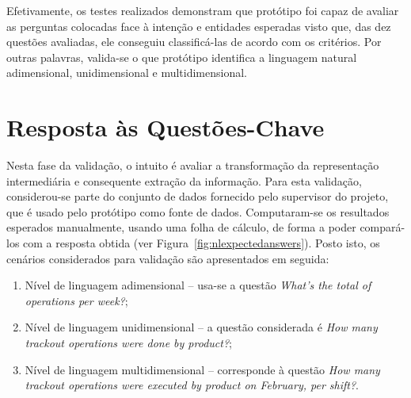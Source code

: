 Efetivamente, os testes realizados demonstram que protótipo foi capaz de avaliar as perguntas colocadas face à intenção e entidades esperadas visto que, das dez questões avaliadas, ele conseguiu classificá-las de acordo com os critérios. Por outras palavras, valida-se o que protótipo identifica a linguagem natural adimensional, unidimensional e multidimensional.

\section{Resposta às Questões-Chave}
\label{sec:chap06_answers}
Nesta fase da validação, o intuito é avaliar a transformação da representação intermediária e consequente extração da informação. Para esta validação, considerou-se parte do conjunto de dados fornecido pelo supervisor do projeto, que é usado pelo protótipo como fonte de dados. Computaram-se os resultados esperados manualmente, usando uma folha de cálculo, de forma a poder compará-los com a resposta obtida (ver Figura~\ref{fig:nlexpectedanswers}). Posto isto, os cenários considerados para validação são apresentados em seguida:
\begin{enumerate}
    \item
    {
         Nível de linguagem adimensional -- usa-se a questão \textit{What’s the total of operations per week?};
    }
    \item
    {
        Nível de linguagem unidimensional -- a questão considerada é \textit{How many trackout operations were done by product?};
    }
    \item
    {
        Nível de linguagem multidimensional -- corresponde à questão \textit{How many trackout operations were executed by product on February, per shift?}.
    }
\end{enumerate}

